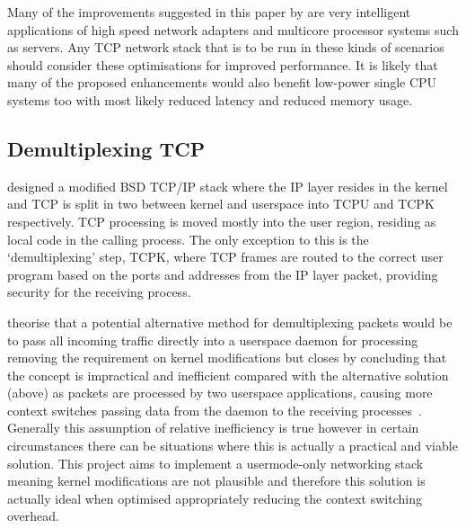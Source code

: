 \documentclass[11pt,a4paper,british]{bhamarticle}
\begin{document}
Many of the improvements suggested in this paper by \citeauthor{jeong2014mtcp} are very intelligent applications of high speed network adapters and multicore processor systems such as servers. Any TCP network stack that is to be run in these kinds of scenarios should consider these optimisations for improved performance. It is likely that many of the proposed enhancements would also benefit low-power single CPU systems too with most likely reduced latency and reduced memory usage.

\subsection{Demultiplexing TCP}
\citeauthor{braun:inria-00074040} designed a modified BSD TCP/IP stack where the IP layer resides in the kernel and TCP is split in two between kernel and userspace into TCPU and TCPK respectively. TCP processing is moved mostly into the user region, residing as local code in the calling process. The only exception to this is the `demultiplexing' step, TCPK, where TCP frames are routed to the correct user program based on the ports and addresses from the IP layer packet, providing security for the receiving process.

\citeauthor{braun:inria-00074040} theorise that a potential alternative method for demultiplexing packets would be to pass all incoming traffic directly into a userspace daemon for processing removing the requirement on kernel modifications but closes by concluding that the concept is impractical and inefficient compared with the alternative solution (above) as packets are processed by two userspace applications, causing more context switches passing data from the daemon to the receiving processes~\cite[2.1]{braun:inria-00074040}\cite[3]{edwards1995experiences}. Generally this assumption of relative inefficiency is true however in certain circumstances there can be situations where this is actually a practical and viable solution. This project aims to implement a usermode-only networking stack meaning kernel modifications are not plausible and therefore this solution is actually ideal when optimised appropriately reducing the context switching overhead.
\end{document}

